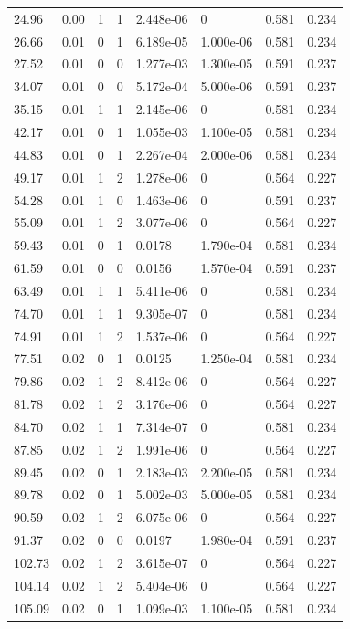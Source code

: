 \documentclass[preview]{standalone}
\begin{document}
{{\begin{tabular}{L{1.2cm}C{1.2cm} C{0.3cm}C{0.5cm} C{1.4cm}C{1.4cm} C{1.4cm}C{1.4cm}}
  24.96  &  0.00  & 1     &  1 &  2.448e-06  & 0  & 0.581 &  0.234   \\ 
  26.66  &  0.01  & 0     &  1 &  6.189e-05  & 1.000e-06  & 0.581 &  0.234   \\ 
  27.52  &  0.01  & 0     &  0 &  1.277e-03  & 1.300e-05  & 0.591 &  0.237   \\ 
  34.07  &  0.01  & 0     &  0 &  5.172e-04  & 5.000e-06  & 0.591 &  0.237   \\ 
  35.15  &  0.01  & 1     &  1 &  2.145e-06  & 0  & 0.581 &  0.234   \\ 
  42.17  &  0.01  & 0     &  1 &  1.055e-03  & 1.100e-05  & 0.581 &  0.234   \\ 
  44.83  &  0.01  & 0     &  1 &  2.267e-04  & 2.000e-06  & 0.581 &  0.234   \\ 
  49.17  &  0.01  & 1     &  2 &  1.278e-06  & 0  & 0.564 &  0.227   \\ 
  54.28  &  0.01  & 1     &  0 &  1.463e-06  & 0  & 0.591 &  0.237   \\ 
  55.09  &  0.01  & 1     &  2 &  3.077e-06  & 0  & 0.564 &  0.227   \\ 
  59.43  &  0.01  & 0     &  1 &  0.0178  & 1.790e-04  & 0.581 &  0.234   \\ 
  61.59  &  0.01  & 0     &  0 &  0.0156  & 1.570e-04  & 0.591 &  0.237   \\ 
  63.49  &  0.01  & 1     &  1 &  5.411e-06  & 0  & 0.581 &  0.234   \\ 
  74.70  &  0.01  & 1     &  1 &  9.305e-07  & 0  & 0.581 &  0.234   \\ 
  74.91  &  0.01  & 1     &  2 &  1.537e-06  & 0  & 0.564 &  0.227   \\ 
  77.51  &  0.02  & 0     &  1 &  0.0125  & 1.250e-04  & 0.581 &  0.234   \\ 
  79.86  &  0.02  & 1     &  2 &  8.412e-06  & 0  & 0.564 &  0.227   \\ 
  81.78  &  0.02  & 1     &  2 &  3.176e-06  & 0  & 0.564 &  0.227   \\ 
  84.70  &  0.02  & 1     &  1 &  7.314e-07  & 0  & 0.581 &  0.234   \\ 
  87.85  &  0.02  & 1     &  2 &  1.991e-06  & 0  & 0.564 &  0.227   \\ 
  89.45  &  0.02  & 0     &  1 &  2.183e-03  & 2.200e-05  & 0.581 &  0.234   \\ 
  89.78  &  0.02  & 0     &  1 &  5.002e-03  & 5.000e-05  & 0.581 &  0.234   \\ 
  90.59  &  0.02  & 1     &  2 &  6.075e-06  & 0  & 0.564 &  0.227   \\ 
  91.37  &  0.02  & 0     &  0 &  0.0197  & 1.980e-04  & 0.591 &  0.237   \\ 
  102.73  &  0.02  & 1     &  2 &  3.615e-07  & 0  & 0.564 &  0.227   \\ 
  104.14  &  0.02  & 1     &  2 &  5.404e-06  & 0  & 0.564 &  0.227   \\ 
  105.09  &  0.02  & 0     &  1 &  1.099e-03  & 1.100e-05  & 0.581 &  0.234   \\ 
\hline 
\end{tabular} 

}}
\end{document}
